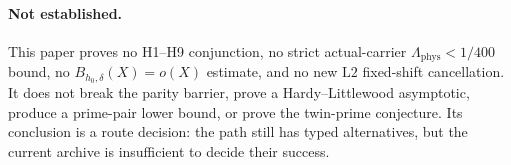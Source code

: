 \documentclass[11pt,a4paper]{article}
\theoremstyle{definition}
\theoremstyle{remark}
\newcommand{\Ltwo}{\mathrm{L2}}
\newcommand{\Lam}{\Lambda_{\mathrm{phys}}}
\begin{document}
\paragraph{Not established.}
This paper proves no H1--H9 conjunction, no strict actual-carrier
\(\Lam<1/400\) bound, no \(B_{h_0,\delta}(X)=o(X)\) estimate, and no
new \(\Ltwo\) fixed-shift cancellation.  It does not break the parity
barrier, prove a Hardy--Littlewood asymptotic, produce a prime-pair
lower bound, or prove the twin-prime conjecture.  Its conclusion is a
route decision: the path still has typed alternatives, but the
current archive is insufficient to decide their success.

\begingroup
\small
\setlength{\bibsep}{2pt plus 0.3ex}
\sloppy


\endgroup
\end{document}

